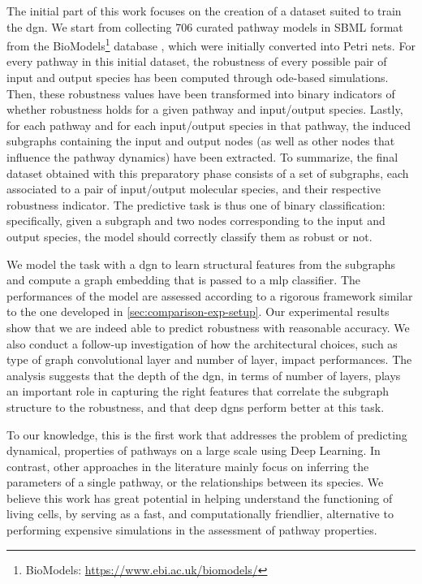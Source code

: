 The initial part of this work focuses on the creation of a dataset suited to train the \gls{dgn}. We start from collecting 706 curated pathway models in SBML format from the BioModels\footnote{BioModels: \url{https://www.ebi.ac.uk/biomodels/}} database \citep{?}, which were initially converted into Petri nets. For every pathway in this initial dataset, the robustness of every possible pair of input and output species has been computed through \gls{ode}-based simulations. Then, these robustness values have been transformed into binary indicators of whether robustness holds for a given pathway and input/output species. Lastly, for each pathway and for each input/output species in that pathway, the induced subgraphs containing the input and output nodes (as well as other nodes that influence the pathway dynamics) have been extracted. To summarize, the final dataset obtained with this preparatory phase consists of a set of subgraphs, each associated to a pair of input/output molecular species, and their respective robustness indicator. The predictive task is thus one of binary classification: specifically, given a subgraph and two nodes corresponding to the input and output species, the model should correctly classify them as robust or not.

We model the task with a \gls{dgn} to learn structural features from the subgraphs and compute a graph embedding that is passed to a \gls{mlp} classifier. The performances of the model are assessed according to a rigorous framework similar to the one developed in \ref{sec:comparison-exp-setup}. Our experimental results show that we are indeed able to predict robustness with reasonable accuracy. We also conduct a follow-up investigation of how the architectural choices, such as type of graph convolutional layer and number of layer, impact performances. The analysis suggests that the depth of the \gls{dgn}, in terms of number of layers, plays an important role in capturing the right features that correlate the subgraph structure to the robustness, and that deep \glspl{dgn} perform better at this task.

To our knowledge, this is the first work that addresses the problem of predicting dynamical, properties of pathways on a large scale using Deep Learning. In contrast, other approaches in the literature mainly focus on inferring the parameters of a single pathway, or the relationships between its species. We believe this work has great potential in helping understand the functioning of living cells, by serving as a fast, and computationally friendlier, alternative to performing expensive simulations in the assessment of pathway properties.

